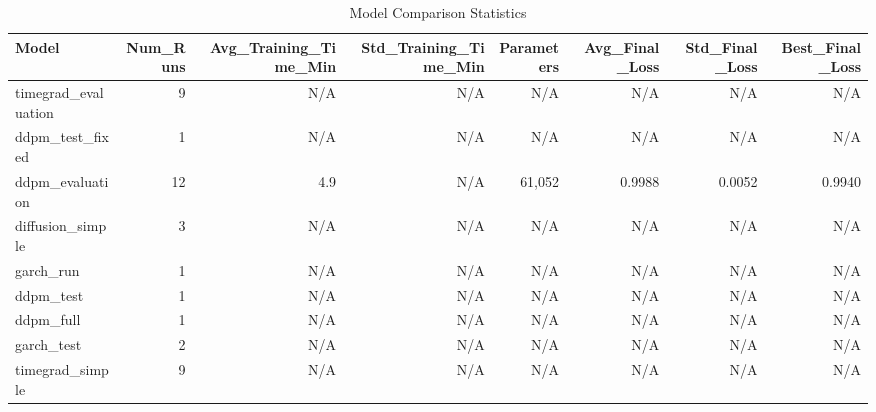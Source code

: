 \begin{table}
\caption{Model Comparison Statistics}
\label{tab:model_comparison}
\begin{tabular}{l|r|r|r|r|r|r|r}
\toprule
Model & Num_Runs & Avg_Training_Time_Min & Std_Training_Time_Min & Parameters & Avg_Final_Loss & Std_Final_Loss & Best_Final_Loss \\
\midrule
timegrad_evaluation & 9 & N/A & N/A & N/A & N/A & N/A & N/A \\
ddpm_test_fixed & 1 & N/A & N/A & N/A & N/A & N/A & N/A \\
ddpm_evaluation & 12 & 4.9 & N/A & 61,052 & 0.9988 & 0.0052 & 0.9940 \\
diffusion_simple & 3 & N/A & N/A & N/A & N/A & N/A & N/A \\
garch_run & 1 & N/A & N/A & N/A & N/A & N/A & N/A \\
ddpm_test & 1 & N/A & N/A & N/A & N/A & N/A & N/A \\
ddpm_full & 1 & N/A & N/A & N/A & N/A & N/A & N/A \\
garch_test & 2 & N/A & N/A & N/A & N/A & N/A & N/A \\
timegrad_simple & 9 & N/A & N/A & N/A & N/A & N/A & N/A \\
\bottomrule
\end{tabular}
\end{table}
